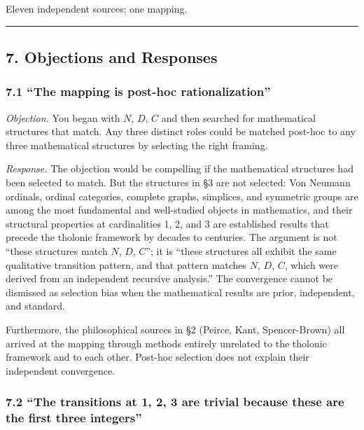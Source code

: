\documentclass[
  11pt,
  letterpaper,
]{article}
\begin{document}
Eleven independent sources; one mapping.

\begin{center}\rule{0.5\linewidth}{0.5pt}\end{center}

\subsection{7. Objections and Responses}\label{objections-and-responses}

\subsubsection{7.1 ``The mapping is post-hoc
rationalization''}\label{the-mapping-is-post-hoc-rationalization}

\emph{Objection.} You began with \(N\), \(D\), \(C\) and then searched
for mathematical structures that match. Any three distinct roles could
be matched post-hoc to any three mathematical structures by selecting
the right framing.

\emph{Response.} The objection would be compelling if the mathematical
structures had been selected to match. But the structures in §3 are not
selected: Von Neumann ordinals, ordinal categories, complete graphs,
simplices, and symmetric groups are among the most fundamental and
well-studied objects in mathematics, and their structural properties at
cardinalities 1, 2, and 3 are established results that precede the
tholonic framework by decades to centuries. The argument is not ``these
structures match \(N\), \(D\), \(C\)''; it is ``these structures all
exhibit the same qualitative transition pattern, and that pattern
matches \(N\), \(D\), \(C\), which were derived from an independent
recursive analysis.'' The convergence cannot be dismissed as selection
bias when the mathematical results are prior, independent, and standard.

Furthermore, the philosophical sources in §2 (Peirce, Kant,
Spencer-Brown) all arrived at the mapping through methods entirely
unrelated to the tholonic framework and to each other. Post-hoc
selection does not explain their independent convergence.

\subsubsection{7.2 ``The transitions at 1, 2, 3 are trivial because
these are the first three
integers''}\label{the-transitions-at-1-2-3-are-trivial-because-these-are-the-first-three-integers}
\end{document}

